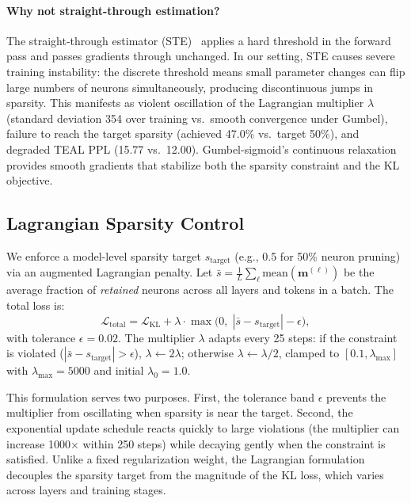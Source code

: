 \paragraph{Why not straight-through estimation?}
The straight-through estimator (STE)~\cite{placeholder_ste} applies a hard threshold in the forward pass and passes gradients through unchanged.
In our setting, STE causes severe training instability: the discrete threshold means small parameter changes can flip large numbers of neurons simultaneously, producing discontinuous jumps in sparsity.
This manifests as violent oscillation of the Lagrangian multiplier $\lambda$ (standard deviation 354 over training vs.\ smooth convergence under Gumbel), failure to reach the target sparsity (achieved 47.0\% vs.\ target 50\%), and degraded TEAL PPL (15.77 vs.\ 12.00).
Gumbel-sigmoid's continuous relaxation provides smooth gradients that stabilize both the sparsity constraint and the KL objective.

\subsection{Lagrangian Sparsity Control}
\label{sec:method:lagrangian}

We enforce a model-level sparsity target $s_{\text{target}}$ (e.g., 0.5 for 50\% neuron pruning) via an augmented Lagrangian penalty.
Let $\bar{s} = \frac{1}{L} \sum_\ell \text{mean}(\mathbf{m}^{(\ell)})$ be the average fraction of \emph{retained} neurons across all layers and tokens in a batch.
The total loss is:
\begin{equation}
\mathcal{L}_{\text{total}} = \mathcal{L}_{\text{KL}} + \lambda \cdot \max\!\bigl(0,\; |\bar{s} - s_{\text{target}}| - \epsilon\bigr),
\label{eq:lagrangian}
\end{equation}
with tolerance $\epsilon{=}0.02$.
The multiplier $\lambda$ adapts every 25 steps: if the constraint is violated ($|\bar{s} - s_{\text{target}}| > \epsilon$), $\lambda \leftarrow 2\lambda$; otherwise $\lambda \leftarrow \lambda/2$, clamped to $[0.1, \lambda_{\max}]$ with $\lambda_{\max}{=}5000$ and initial $\lambda_0{=}1.0$.

This formulation serves two purposes.
First, the tolerance band $\epsilon$ prevents the multiplier from oscillating when sparsity is near the target.
Second, the exponential update schedule reacts quickly to large violations (the multiplier can increase 1000$\times$ within 250 steps) while decaying gently when the constraint is satisfied.
Unlike a fixed regularization weight, the Lagrangian formulation decouples the sparsity target from the magnitude of the KL loss, which varies across layers and training stages.

